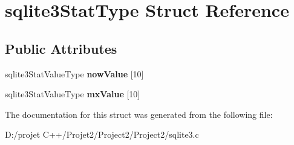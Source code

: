 \hypertarget{structsqlite3_stat_type}{}\section{sqlite3\+Stat\+Type Struct Reference}
\label{structsqlite3_stat_type}
\subsection*{Public Attributes}
\begin{DoxyCompactItemize}
\item 
\mbox{\label{structsqlite3_stat_type_a5392980881ceea3ac2f01e4cd1b4facf}} 
sqlite3\+Stat\+Value\+Type {\bfseries now\+Value} \mbox{[}10\mbox{]}
\item 
\mbox{\label{structsqlite3_stat_type_a7a3c8330f4dbca3b253a45982ba169c9}} 
sqlite3\+Stat\+Value\+Type {\bfseries mx\+Value} \mbox{[}10\mbox{]}
\end{DoxyCompactItemize}


The documentation for this struct was generated from the following file\+:\begin{DoxyCompactItemize}
\item 
D\+:/projet C++/\+Projet2/\+Project2/\+Project2/sqlite3.\+c\end{DoxyCompactItemize}
